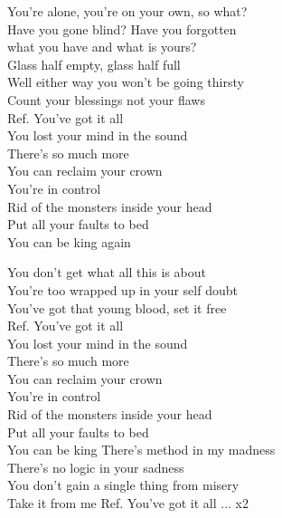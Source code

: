 
You're alone, you're on your own, so what? \\
Have you gone blind? Have you forgotten \\
what you have and what is yours? \\
Glass half empty, glass half full \\
Well either way you won't be going thirsty\\
Count your blessings not your flaws\\
\hops
Ref. You've got it all \tab{}\\
 You lost your mind in the sound \\
 There's so much more \tab{}\\
 You can reclaim your crown \\
 You're in control \tab{}\\
 Rid of the monsters inside your head \\
 Put all your faults to bed\tab{}\\
 You can be king again \tab{}
\hops

You don't get what all this is about \\
You're too wrapped up in your self doubt \\
You've got that young blood, set it free \\
\hops
Ref. You've got it all \tab{}\\
 You lost your mind in the sound \\
 There's so much more \tab{}\\
 You can reclaim your crown \\
 You're in control \tab{}\\
 Rid of the monsters inside your head \\
 Put all your faults to bed\tab{}\\
 You can be king \tab{}
\hops
There's method in my madness \\
There's no logic in your sadness \\
You don't gain a single thing from misery \\
Take it from me \tab{}
\hops
 Ref. You've got it all ... x2

